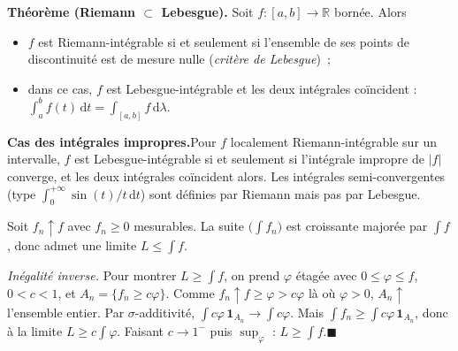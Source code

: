 
\begin{tcolorbox}[thmbox]
  \textbf{Théorème (Riemann $\subset$ Lebesgue).}\enspace%
  Soit $f:[a,b]\to\mathbb{R}$ bornée. Alors
  \begin{itemize}
    \item $f$ est Riemann-intégrable si et seulement si l'ensemble de ses
          points de discontinuité est de mesure nulle (\emph{critère de
          Lebesgue})~;
    \item dans ce cas, $f$ est Lebesgue-intégrable et les deux intégrales
          coïncident :
          $\displaystyle\int_a^b f(t)\,\mathrm{d}t = \int_{[a,b]} f\,\mathrm{d}\lambda.$
  \end{itemize}
  \textbf{Cas des intégrales impropres.}\enspace Pour $f$ localement
  Riemann-intégrable sur un intervalle, $f$ est Lebesgue-intégrable si et
  seulement si l'intégrale impropre de $|f|$ converge, et les deux
  intégrales coïncident alors.
  Les intégrales semi-convergentes (type $\int_0^{+\infty}\sin(t)/t\,\mathrm{d}t$)
  sont définies par Riemann mais pas par Lebesgue.
\end{tcolorbox}

\decsep{}



\begin{mdframed}[style=proofbar]
  Soit $f_n \uparrow f$ avec $f_n \geq 0$ mesurables. La suite
  $\bigl(\int f_n\bigr)$ est croissante majorée par $\int f$, donc admet
  une limite $L \leq \int f$.

  \medskip
  \textit{Inégalité inverse.}\enspace%
  Pour montrer $L \geq \int f$, on prend $\varphi$ étagée avec
  $0 \leq \varphi \leq f$, $0 < c < 1$, et $A_n = \{f_n \geq c\varphi\}$.
  Comme $f_n \uparrow f \geq \varphi > c\varphi$ là où $\varphi>0$,
  $A_n \uparrow$ l'ensemble entier. Par $\sigma$-additivité,
  $\int c\varphi\,\mathbf{1}_{A_n} \to \int c\varphi$. Mais
  $\int f_n \geq \int c\varphi\,\mathbf{1}_{A_n}$, donc à la limite
  $L \geq c\int\varphi$. Faisant $c \to 1^-$ puis $\sup_\varphi$ :
  $L \geq \int f$.\hfill$\blacksquare$
\end{mdframed}


